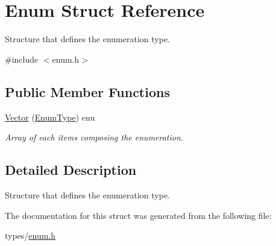 \hypertarget{struct_enum}{}\section{Enum Struct Reference}
\label{struct_enum}


Structure that defines the enumeration type.  




{\ttfamily \#include $<$enum.\+h$>$}

\subsection*{Public Member Functions}
\begin{DoxyCompactItemize}
\item 
\hyperlink{struct_enum_af76872404a1950661d0cf9b901ad230b}{Vector} (\hyperlink{struct_enum_type}{Enum\+Type}) enu\hypertarget{struct_enum_af76872404a1950661d0cf9b901ad230b}{}\label{struct_enum_af76872404a1950661d0cf9b901ad230b}

\begin{DoxyCompactList}\small\item\em Array of each items composing the enumeration. \end{DoxyCompactList}\end{DoxyCompactItemize}


\subsection{Detailed Description}
Structure that defines the enumeration type. 

The documentation for this struct was generated from the following file\+:\begin{DoxyCompactItemize}
\item 
types/\hyperlink{enum_8h}{enum.\+h}\end{DoxyCompactItemize}
